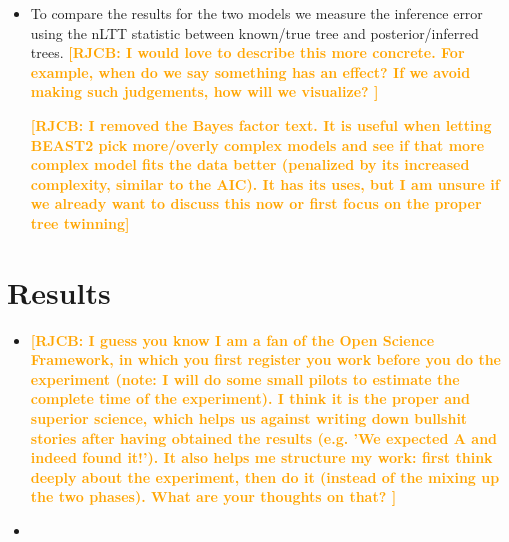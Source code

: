 \documentclass{article}
\newcommand*\richel[1]{\textcolor{orange}{\textbf{[RJCB: #1]}}}
\begin{document}
\begin{itemize}
\item To compare the results for the two models we measure the inference error using the nLTT statistic between known/true tree and posterior/inferred trees.
\richel{
  I would love to describe this more concrete. For example, when do
  we say something has an effect? If we avoid making such judgements,
  how will we visualize?
}

\richel{I removed the Bayes factor text. It is useful when letting BEAST2
pick more/overly complex models and see if that more complex model fits the
data better (penalized by its increased complexity, similar to the AIC). It has
its uses, but I am unsure if we already want to discuss this now
or first focus on the proper tree twinning}



\end{itemize}

\section{Results}
\begin{itemize}

\item
\richel{
  I guess you know I am a fan of the Open Science Framework,
  in which you first register you work before you do the experiment
  (note: I will do some small pilots to estimate the complete time
  of the experiment). I think it is the proper and superior science,
  which helps us against writing down bullshit stories after having
  obtained the results (e.g. 'We expected A and indeed found it!').
  It also helps me structure my work: first think
  deeply about the experiment, then do it (instead of the mixing
  up the two phases). What are your thoughts on that?
}

\item

\end{itemize}



\end{document}
